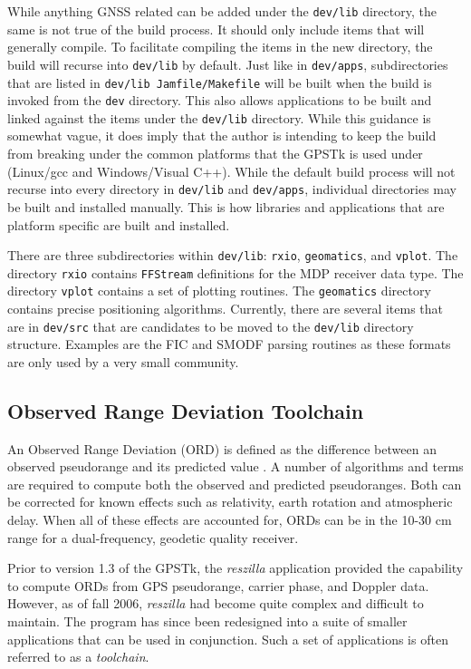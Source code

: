 \documentclass[letterpaper,ugly,10pt]{ion-gps}
\newcommand{\gpstkapp}[1]{\textit{\mbox{#1}}}
\newcommand{\gpstkdir}[1]{\texttt{\mbox{#1}}}
\newcommand{\gpstkclass}[1]{\texttt{\mbox{#1}}}
\begin{document}
While anything GNSS related can be added under the \gpstkdir{dev/lib} directory, the same is not true of the build process. It should only include items that will generally compile. To facilitate compiling the items in the new directory, the build will recurse into \gpstkdir{dev/lib} by default. Just like in \gpstkdir{dev/apps}, subdirectories that are listed in \gpstkdir{dev/lib Jamfile/Makefile} will be built when the build is invoked from the \gpstkdir{dev} directory. This also allows applications to be built and linked against the items under the \gpstkdir{dev/lib} directory.  While this guidance is somewhat vague, it does imply that the author is intending to keep the build from breaking under the common platforms that the GPSTk is used under (Linux/gcc and Windows/Visual C++). While the default build process will not recurse into every directory in \gpstkdir{dev/lib} and \gpstkdir{dev/apps}, individual directories may be built and installed manually. This is how libraries and applications that are platform specific are built and installed.

There are three subdirectories within \gpstkdir{dev/lib}: \gpstkdir{rxio}, \gpstkdir{geomatics}, and \gpstkdir{vplot}. The directory \gpstkdir{rxio} contains \gpstkclass{FFStream} definitions for the MDP receiver data type. The directory \gpstkdir{vplot} contains a set of plotting routines. The \gpstkdir{geomatics} directory contains precise positioning algorithms. Currently, there are several items that are in \gpstkdir{dev/src} that are candidates to be moved to the \gpstkdir{dev/lib} directory structure. Examples are the FIC and SMODF parsing routines as these formats are only used by a very small community.

\subsection*{Observed Range Deviation Toolchain}
An Observed Range Deviation (ORD) is defined as the difference between an observed pseudorange and its predicted value \cite[p.465]{ps:gta}. A number of algorithms and terms are required to compute both the observed and predicted pseudoranges. Both can be corrected for known effects such as relativity, earth rotation and atmospheric delay. When all of these effects are accounted for, ORDs can be in the 10-30 cm range for a dual-frequency, geodetic quality receiver.

Prior to version 1.3 of the GPSTk, the \gpstkapp{reszilla} application provided the capability to compute ORDs from GPS pseudorange, carrier phase, and Doppler data. However, as of fall 2006, \gpstkapp{reszilla} had become quite complex and difficult to maintain. The program has since been redesigned into a suite of smaller applications that can be used in conjunction. Such a set of applications is often referred to as a \emph{toolchain}.
\end{document}
